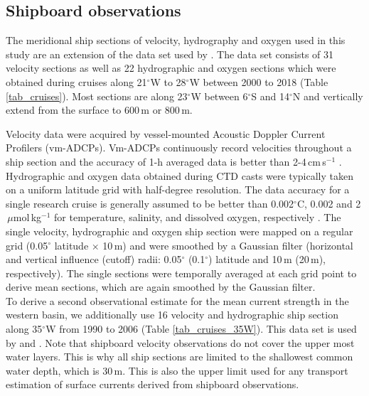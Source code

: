\documentclass[os, manuscript]{copernicus}
\begin{document}
\subsection{Shipboard observations}
The meridional ship sections of velocity, hydrography and oxygen used in this study are an extension of the data set used by \citet{Burmeister2020}. The data set consists of 31 velocity sections as well as 22 hydrographic and oxygen sections which were obtained during cruises along 21$^{\circ}$W to 28$^{\circ}$W between 2000 to 2018 (Table \ref{tab_cruises}). Most sections are along 23$^{\circ}$W between 6$^{\circ}$S and 14$^{\circ}$N and vertically extend from the surface to 600$ \, $m or 800$ \, $m.

Velocity data were acquired by vessel-mounted Acoustic Doppler Current Profilers (vm-ADCPs). Vm-ADCPs continuously record velocities throughout a ship section and the accuracy of 1-h averaged data is better than 2-4$ \, $cm$ \, $s$ ^{-1} $ \citep{Fischer2003}. Hydrographic and oxygen data obtained during CTD casts were typically taken on a uniform latitude grid with half-degree resolution. The data accuracy for a single research cruise is generally assumed to be better than 0.002$ ^{\circ} $C, 0.002 and 2$ \,\mu $mol$ \, $kg$ ^{-1} $ for temperature, salinity, and dissolved oxygen, respectively \citep{Hahn2017}. The single velocity, hydrographic and oxygen ship section were mapped on a regular grid (0.05$ ^{\circ} $ latitude $ \times $ 10$ \, $m) and were smoothed by a Gaussian filter (horizontal and vertical influence (cutoff) radii: 0.05$ ^{\circ} $ (0.1$ ^{\circ} $) latitude and 10$ \, $m (20$ \, $m), respectively). The single sections were temporally averaged at each grid point to derive mean sections, which are again smoothed by the Gaussian filter. %
\\
To derive a second observational estimate for the mean current strength in the western basin, we additionally use 16 velocity and hydrographic ship section along 35$^{\circ}$W from 1990 to 2006 (Table \ref{tab_cruises_35W}). This data set is used by \cite{Hormann2007} and \cite{Tuchen2022}. Note that shipboard velocity observations do not cover the upper most water layers. This is why all ship sections are limited to the shallowest common water depth, which is 30$\,$m. This is also the upper limit used for any transport estimation of surface currents derived from shipboard observations.
\end{document}
